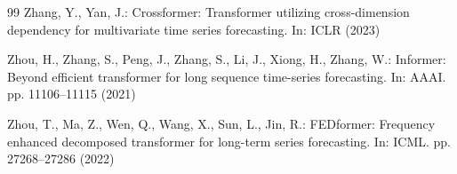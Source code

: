 \documentclass[runningheads]{llncs}
\begin{document}
\begin{thebibliography}{99}
Zhang, Y., Yan, J.: Crossformer: Transformer utilizing cross-dimension
dependency for multivariate time series forecasting. In: ICLR (2023)

Zhou, H., Zhang, S., Peng, J., Zhang, S., Li, J., Xiong, H., Zhang, W.:
Informer: Beyond efficient transformer for long sequence time-series
forecasting. In: AAAI. pp. 11106--11115 (2021)

Zhou, T., Ma, Z., Wen, Q., Wang, X., Sun, L., Jin, R.: FEDformer:
Frequency enhanced decomposed transformer for long-term series
forecasting. In: ICML. pp. 27268--27286 (2022)

\end{thebibliography}
\end{document}
